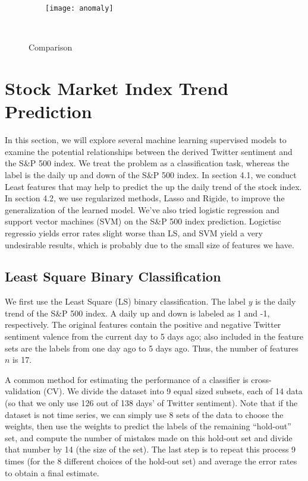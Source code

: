\documentclass[10pt,letterpaper]{article}
\begin{document}
\begin{figure}[!ht]
    \centering
    \texttt{[image: anomaly]}
    \caption{\small Comparison}
    \label{f3}
    
\end{figure}



\section{Stock Market Index Trend Prediction} 
In this section, we will explore several machine learning supervised models to examine the potential relationships between the derived Twitter sentiment and the S\&P 500 index. We treat the problem as a classification task, whereas the label is the daily up and down of the S\&P 500 index. In section 4.1, we conduct Least features that may help to predict the up the daily trend of the stock index. In section 4.2, we use regularized methods, Lasso and Rigide, to improve the generalization of the learned model. We've also tried logistic regression and support vector machines (SVM) on the S\&P 500 index prediction. Logictisc regressio yields error rates slight worse than LS, and SVM yield a very undesirable results, which is probably due to the small size of features we have. 



\subsection{Least Square Binary Classification}
We first use the Least Square (LS) binary classification. The label $y$ is the daily trend of the S\&P 500 index. A daily up and down is labeled as 1 and -1, respectively. The original features contain the positive and negative Twitter sentiment valence from the current day to 5 days ago; also included in the feature sets are the labels from one day ago to 5 days ago. Thus, the number of features $n$ is 17. 

A common method for estimating the performance of a classifier is cross-validation (CV). We divide the dataset into 9 equal sized subsets, each of 14 data (so that we only use 126 out of 138 days' of Twitter sentiment). Note that if the dataset is not time series, we can simply use 8 sets of the data to choose the weights, then use the weights to predict the labels of the remaining ``hold-out'' set, and compute the number of mistakes made on this hold-out set and divide that number by 14 (the size of the set). The last step is to repeat this process 9 times (for the 8 different choices of the hold-out set) and average the error rates to obtain a final estimate. 
\end{document}
